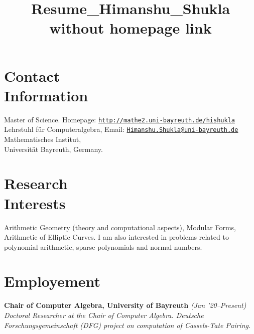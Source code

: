 \documentclass[margin,line]{resume}
\title{Resume_Himanshu_Shukla without homepage link}
\begin{document}
\begin{resume}


    \section{\mysidestyle Contact\\Information}

    Master of Science.                           \hfill  Homepage: \texttt{{\href{http://www.mathe2.uni-bayreuth.de/hishukla}{http://mathe2.uni-bayreuth.de/hishukla}}}\\       
    Lehrstuhl f\"{u}r Computeralgebra, \hfill Email: \texttt{\href{mailto:Himanshu.Shukla@uni-bayreuth.de}{Himanshu.Shukla@uni-bayreuth.de}}\\ 																		%
    Mathematisches Institut,
 \\
    Universit\"{a}t Bayreuth, Germany.		
  \section{\mysidestyle Research\\Interests}

    Arithmetic Geometry (theory and computational aspects), Modular Forms, Arithmetic of Elliptic Curves. I am also interested in problems related to polynomial arithmetic, sparse polynomials and normal numbers. \vspace{-2mm}

    \section{\mysidestyle Employement}
    \textbf{Chair of Computer Algebra, University of Bayreuth} \hfill \textit{ (Jan '20--Present)} \vspace{1mm}\\\vspace{1mm}%
    \textsl{Doctoral Researcher at the Chair of Computer Algebra. Deutsche Forschungsgemeinschaft (DFG) project on computation of Cassels-Tate Pairing}. \vspace{-7mm}\\\vspace{1mm}%
    

\end{resume}
\end{document}
